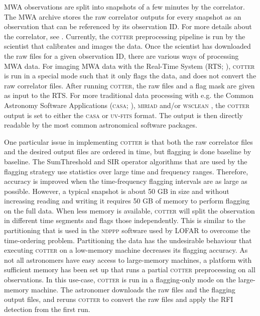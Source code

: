 \documentclass{pasa}
\begin{document}
MWA observations are split into snapshots of a few minutes by the correlator. The MWA archive stores the raw correlator outputs for every snapshot as an observation that can be referenced by its observation ID. For more details about the correlator, see \citet{ord-2014-mwa-fpga-gpu}. Currently, the \textsc{cotter} preprocessing pipeline is run by the scientist that calibrates and images the data. Once the scientist has downloaded the raw files for a given observation ID, there are various ways of processing MWA data. For imaging MWA data with the Real-Time System (RTS; \citealt{rts-mwa-2008}), \textsc{cotter} is run in a special mode such that it only flags the data, and does not convert the raw correlator files. After running \textsc{cotter}, the raw files and a flag mask are given as input to the RTS. For more traditional data processing with e.g. the Common Astronomy Software Applications (\textsc{casa}; \citealt{casa-2008}), \textsc{miriad} \citep{miriad-sault-1995} and/or \textsc{wsclean} \citep{offringa-wsclean-2014}, the \textsc{cotter} output is set to either the \textsc{casa} or \textsc{uv-fits} format. The output is then directly readable by the most common astronomical software packages. 

One particular issue in implementing \textsc{cotter} is that both the raw correlator files and the desired output files are ordered in time, but flagging is done baseline by baseline. The SumThreshold and SIR operator algorithms that are used by the flagging strategy use statistics over large time and frequency ranges. Therefore, accuracy is improved when the time-frequency flagging intervals are as large as possible. However, a typical snapshot is about 50 GB in size and without increasing reading and writing it requires 50 GB of memory to perform flagging on the full data. When less memory is available, \textsc{cotter} will split the observation in different time segments and flags those independently. This is similar to the partitioning that is used in the \textsc{ndppp} software used by LOFAR \citep{lofar-imaging-cookbook} to overcome the time-ordering problem. Partitioning the data has the undesirable behaviour that executing \textsc{cotter} on a low-memory machine decreases its flagging accuracy. As not all astronomers have easy access to large-memory machines, a platform with sufficient memory has been set up that runs a partial \textsc{cotter} preprocessing on all observations. In this use-case, \textsc{cotter} is run in a flagging-only mode on the large-memory machine. The astronomer downloads the raw files and the flagging output files, and reruns \textsc{cotter} to convert the raw files and apply the RFI detection from the first run.
\end{document}

